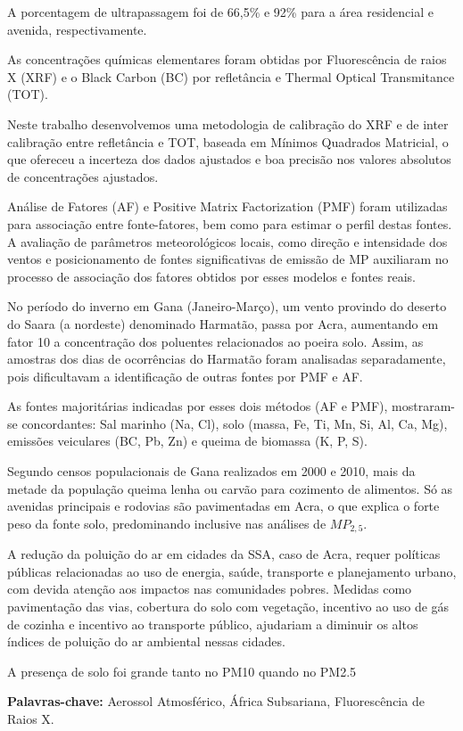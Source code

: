 A porcentagem de ultrapassagem foi de 66,5\% e 92\% para 
a área residencial e avenida, respectivamente. 

As concentrações químicas elementares foram obtidas por 
Fluorescência de raios X (XRF) e o Black Carbon (BC) por 
refletância e Thermal Optical Transmitance (TOT). 

Neste trabalho desenvolvemos uma metodologia de calibração do XRF 
e de inter calibração entre refletância e TOT, 
baseada em Mínimos Quadrados Matricial, o que ofereceu a 
incerteza dos dados ajustados e boa precisão nos valores 
absolutos de concentrações ajustados.

Análise de Fatores (AF) e Positive Matrix Factorization (PMF) foram utilizadas
para associação entre fonte-fatores, bem como para estimar o perfil destas fontes. 
A avaliação de parâmetros meteorológicos locais, como direção e intensidade 
dos ventos e posicionamento de fontes significativas de emissão de MP 
auxiliaram no processo de associação dos fatores obtidos por esses modelos e 
fontes reais. 

No período do inverno em Gana (Janeiro-Março), um vento  
provindo do deserto do Saara (a nordeste) denominado Harmatão, 
passa por Acra, aumentando em fator 10 a concentração dos poluentes 
relacionados ao poeira solo. Assim, as amostras dos dias de ocorrências 
do Harmatão foram analisadas separadamente, pois dificultavam a 
identificação de outras fontes por PMF e AF.

As fontes majoritárias indicadas por esses dois métodos (AF e PMF), 
mostraram-se concordantes: Sal marinho (Na, Cl), solo (massa, Fe, Ti, Mn, 
Si, Al, Ca, Mg), emissões veiculares (BC, Pb, Zn) e queima de 
biomassa (K, P, S). 

Segundo censos populacionais de Gana realizados em 2000 e 2010, 
mais da metade da população queima lenha ou carvão para cozimento 
de alimentos. 
Só as avenidas principais e rodovias são pavimentadas em Acra, 
o que explica o forte peso da fonte solo, predominando 
inclusive nas análises de $MP_{2,5}$.

A redução da poluição do ar em cidades da SSA, caso de Acra, 
requer políticas públicas relacionadas ao uso de energia, saúde, 
transporte e planejamento urbano, com devida atenção 
aos impactos nas comunidades pobres. 
Medidas como pavimentação das vias, cobertura do solo com vegetação, 
incentivo ao uso de gás de cozinha e incentivo ao transporte público, 
ajudariam a diminuir os altos índices de poluição do ar ambiental nessas cidades.

A presença de solo foi grande tanto no PM10 quando no PM2.5

\par
\vspace{1em}
\noindent\textbf{Palavras-chave:}  Aerossol Atmosférico, África Subsariana, Fluorescência de Raios X.
\newpage
